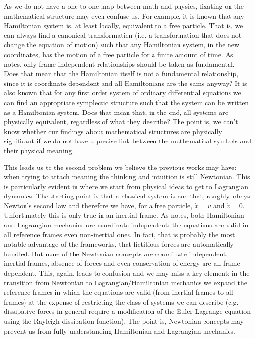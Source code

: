 \documentclass[11pt]{article}
\begin{document}
As we do not have a one-to-one map between math and physics, fixating on the mathematical structure may even confuse us. For example, it is known\cite{AllHamFreeParticle} that any Hamiltonian system is, at least locally, equivalent to a free particle. That is, we can always find a canonical transformation (i.e. a transformation that does not change the equation of motion) such that any Hamiltonian system, in the new coordinates, has the motion of a free particle for a finite amount of time. As \cite{North} notes, only frame independent relationships should be taken as fundamental. Does that mean that the Hamiltonian itself is not a fundamental relationship, since it is coordinate dependent and all Hamiltonians are the same anyway? It is also known\cite{AllSystemsAreHam} that for any first order system of ordinary differential equations we can find an appropriate symplectic structure such that the system can be written as a Hamiltonian system. Does that mean that, in the end, all systems are physically equivalent, regardless of what they describe? The point is, we can't know whether our findings about mathematical structures are physically significant if we do not have a precise link between the mathematical symbols and their physical meaning.

This leads us to the second problem we believe the previous works may have: when trying to attach meaning the thinking and intuition is still Newtonian. This is particularly evident in \cite{Curiel} where we start from physical ideas to get to Lagrangian dynamics. The starting point is that a classical system is one that, roughly, obeys Newton's second law and therefore we have, for a free particle, $\dot{x} = v$ and $\dot{v} = 0$. Unfortunately this is only true in an inertial frame. As \cite{North} notes, both Hamiltonian and Lagrangian mechanics are coordinate independent: the equations are valid in all reference frames even non-inertial ones. In fact, that is probably the most notable advantage of the frameworks, that fictitious forces are automatically handled. But none of the Newtonian concepts are coordinate independent: inertial frames, absence of forces and even conservation of energy are all frame dependent. This, again, leads to confusion and we may miss a key element: in the transition from Newtonian to Lagrangian/Hamiltonian mechanics we expand the reference frames in which the equations are valid (from inertial frames to all frames) at the expense of restricting the class of systems we can describe (e.g. dissipative forces in general require a modification of the Euler-Lagrange equation using the Rayleigh dissipation function). The point is, Newtonian concepts may prevent us from fully understanding Hamiltonian and Lagrangian mechanics.
\end{document}
